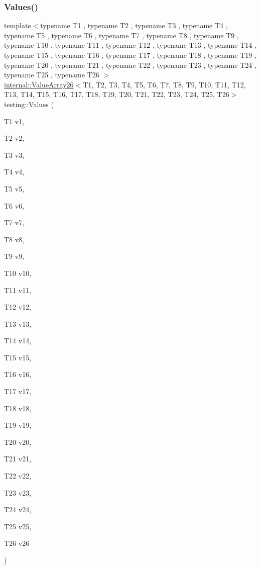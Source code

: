 \mbox{\label{namespacetesting_aeca27a322529e5bbd6331e40c810a123}} 
\subsubsection{\texorpdfstring{Values()}{Values()}\hspace{0.1cm}{\footnotesize\ttfamily [26/50]}}
{\footnotesize\ttfamily template$<$typename T1 , typename T2 , typename T3 , typename T4 , typename T5 , typename T6 , typename T7 , typename T8 , typename T9 , typename T10 , typename T11 , typename T12 , typename T13 , typename T14 , typename T15 , typename T16 , typename T17 , typename T18 , typename T19 , typename T20 , typename T21 , typename T22 , typename T23 , typename T24 , typename T25 , typename T26 $>$ \\
\mbox{\hyperlink{classtesting_1_1internal_1_1ValueArray26}{internal\+::\+Value\+Array26}}$<$T1, T2, T3, T4, T5, T6, T7, T8, T9, T10, T11, T12, T13, T14, T15, T16, T17, T18, T19, T20, T21, T22, T23, T24, T25, T26$>$ testing\+::\+Values (\begin{DoxyParamCaption}\item[{T1}]{v1,  }\item[{T2}]{v2,  }\item[{T3}]{v3,  }\item[{T4}]{v4,  }\item[{T5}]{v5,  }\item[{T6}]{v6,  }\item[{T7}]{v7,  }\item[{T8}]{v8,  }\item[{T9}]{v9,  }\item[{T10}]{v10,  }\item[{T11}]{v11,  }\item[{T12}]{v12,  }\item[{T13}]{v13,  }\item[{T14}]{v14,  }\item[{T15}]{v15,  }\item[{T16}]{v16,  }\item[{T17}]{v17,  }\item[{T18}]{v18,  }\item[{T19}]{v19,  }\item[{T20}]{v20,  }\item[{T21}]{v21,  }\item[{T22}]{v22,  }\item[{T23}]{v23,  }\item[{T24}]{v24,  }\item[{T25}]{v25,  }\item[{T26}]{v26 }\end{DoxyParamCaption})}

